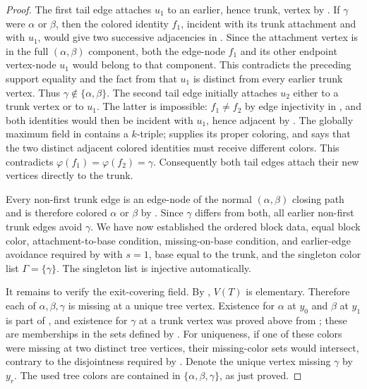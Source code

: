 \begin{proof}
The first tail edge attaches $u_1$ to an earlier, hence trunk, vertex by
.  If $\gamma$ were $\alpha$ or $\beta$, then the
colored identity $f_1$, incident with its trunk attachment and with $u_1$,
would give two successive adjacencies in
.  Since the attachment vertex is in the
full $(\alpha,\beta)$ component, both the edge-node $f_1$ and its other
endpoint vertex-node $u_1$ would belong to that component.  This contradicts
the preceding support equality and the fact from 
that $u_1$ is distinct from every earlier trunk vertex.  Thus
$\gamma\notin\{\alpha,\beta\}$.  The second tail edge initially attaches
$u_2$ either to a trunk vertex or to $u_1$.  The latter is impossible:
$f_1\ne f_2$ by edge injectivity in , and both
identities would then be incident with $u_1$, hence adjacent by
.  The globally maximum field in
 contains a $k$-triple; 
supplies its proper coloring, and  says that
the two distinct adjacent colored identities must receive different
colors.  This contradicts
$\varphi(f_1)=\varphi(f_2)=\gamma$.  Consequently both tail edges attach
their new vertices directly to the trunk.

Every non-first trunk edge is an edge-node of the normal
$(\alpha,\beta)$ closing path and is therefore colored $\alpha$ or
$\beta$ by .  Since $\gamma$ differs from
both, all earlier non-first trunk edges avoid $\gamma$.  We have now
established the ordered block data,
equal block color, attachment-to-base condition, missing-on-base condition,
and earlier-edge avoidance required by
 with $s=1$, base equal to the
trunk, and the singleton color list $\Gamma=\{\gamma\}$.  The singleton
list is injective automatically.

It remains to verify the exit-covering field.  By
, $V(T)$ is elementary.  Therefore each
of $\alpha,\beta,\gamma$ is missing at a unique tree vertex.  Existence for
$\alpha$ at $y_0$ and $\beta$ at $y_1$ is part of
, and existence for $\gamma$ at a trunk
vertex was proved above from ; these are memberships
in the sets defined by .  For uniqueness, if one of
these colors were missing at two distinct tree vertices, their missing-color
sets would intersect, contrary to the disjointness required by
.  Denote the unique vertex missing
$\gamma$ by $y_r$.  The used tree colors are contained in
$\{\alpha,\beta,\gamma\}$, as just proved.


\end{proof}
